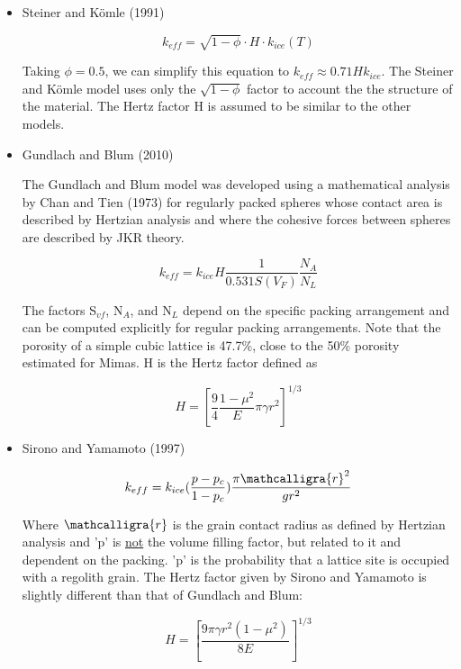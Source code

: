 \documentclass[11pt]{article} %
\newcommand{\vf}{\ensuremath{V_{F}}\xspace}
\newcommand{\sr}{\ensuremath{\mathcalligra{r}} \xspace}
\begin{document}
\begin{itemize}
	\item Steiner and K\"{o}mle (1991)
		
		\begin{equation}
		 k_{eff} = \sqrt{1-\phi}\cdot H \cdot k_{ice}(T)
		\end{equation}
		
	Taking $\phi = 0.5$, we can simplify this equation to $ k_{eff} \approx 0.71 H k_{ice}$. The Steiner and K\"omle model uses only the $\sqrt{1-\phi}$ factor to account the the structure of the material. The Hertz factor H is assumed to be similar to the other models. 

	\item Gundlach and Blum (2010)
		
	The Gundlach and Blum model was developed using a mathematical analysis by Chan and Tien (1973) for regularly packed spheres whose contact area is described by Hertzian analysis and where the cohesive forces between spheres are described by JKR theory.
	
		\begin{equation}
		k_{eff} = k_{ice} H \frac{1}{0.531 S(\vf)} \frac{N_{A}}{N_{L}}
		\end{equation}
		
	The factors S$_{vf}$, N$_{A}$, and N$_{L}$ depend on the specific packing arrangement and can be computed explicitly for regular packing arrangements. Note that the porosity of a simple cubic lattice is 47.7\%, close to the 50\% porosity estimated for Mimas. H is the Hertz factor defined as
	
		\begin{equation}
		 H = [\frac{9}{4} \frac{1-\mu^{2}}{E} \pi \gamma r^{2} ]^{1/3}
		\end{equation}
	
	
	\item Sirono and Yamamoto (1997)
		
		\begin{equation}
		k_{eff} = k_{ice} ( \frac{p - p_{c}}{1-p_{c}} )\frac{\pi \sr^{2}}{g r^{2}}
		\end{equation}
		
		Where \sr is the grain contact radius as defined by Hertzian analysis and 'p' is \underline{not} the volume filling factor, but related to it and dependent on the packing. 'p' is the probability that a lattice site is occupied with a regolith grain. The Hertz factor given by Sirono and Yamamoto is slightly different than that of Gundlach and Blum:
		
		\begin{equation}
		H = [ \frac{9 \pi \gamma r^{2} (1-\mu^{2})}{8 E} ]^{1/3}
		\end{equation}
		
	\end{itemize}
\end{document}
